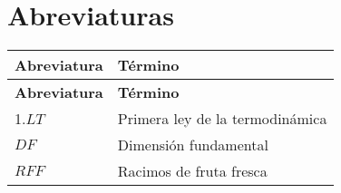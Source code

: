 \setlength{\extrarowheight}{0pt}


\section*{Abreviaturas}
\begin{longtable}[l]{>{}l<{}l}
  \textbf{Abreviatura} & \textbf{Término} \\[0.5ex] \hline%
  \endfirsthead%
  \textbf{Abreviatura} & \textbf{Término} \\[0.5ex] \hline%
  \endhead%
\renewcommand{\arraystretch}{1.4}\label{simbolosg}
 1.$LT$&Primera ley de la termodinámica\\%
 $DF$    &Dimensión fundamental\\%
 $RFF$   &Racimos de fruta fresca\\%

\end{longtable}


\setlength{\extrarowheight}{0pt}
